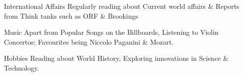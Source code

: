 


\begin{cvskills}


\cvskill
{International Affairs} %
{Regularly reading about Current world affairs \& Reports from Think tanks such as ORF \& Brookings} %


\cvskill
{Music} %
{Apart from Popular Songs on the Billboards, Listening to Violin Concertos; Favourites being Niccolo Paganini \& Mozart.} %


\cvskill
{Hobbies} %
{Reading about World History, Exploring innovations in Science \& Technology.} %


\end{cvskills}
\vspace{-0.5\baselineskip} 